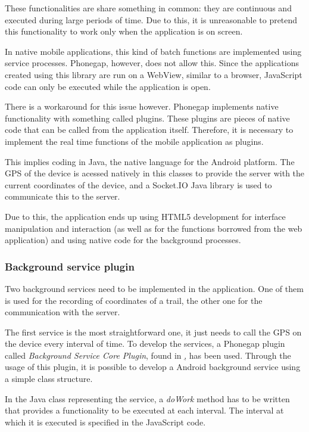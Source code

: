 These functionalities are share something in common: they are continuous and executed during large periods of time. Due to this, it is unreasonable to pretend this functionality to work only when the application is on screen.

In native mobile applications, this kind of batch functions are implemented using service processes. Phonegap, however, does not allow this. Since the applications created using this library are run on a WebView, similar to a browser, JavaScript code can only be executed while the application is open.

There is a workaround for this issue however. Phonegap implements native functionality with something called plugins. These plugins are pieces of native code that can be called from the application itself. Therefore, it is necessary to implement the real time functions of the mobile application as plugins.

This implies coding in Java, the native language for the Android platform. The GPS of the device is acessed natively in this classes to provide the server with the current coordinates of the device, and a Socket.IO Java library is used to communicate this to the server.

Due to this, the application ends up using HTML5 development for interface manipulation and interaction (as well as for the functions borrowed from the web application) and using native code for the background processes.

\subsubsection*{Background service plugin}

Two background services need to be implemented in the application. One of them is used for the recording of coordinates of a trail, the other one for the communication with the server.

The first service is the most straightforward one, it just needs to call the GPS on the device every interval of time. To develop the services, a Phonegap plugin called \textit{Background Service Core Plugin}, found in \href{https://github.com/Red-Folder/bgs-core}, has been used. Through the usage of this plugin, it is possible to develop a Android background service using a simple class structure.

In the Java class representing the service, a \textit{doWork} method has to be written that provides a functionality to be executed at each interval. The interval at which it is executed is specified in the JavaScript code.


